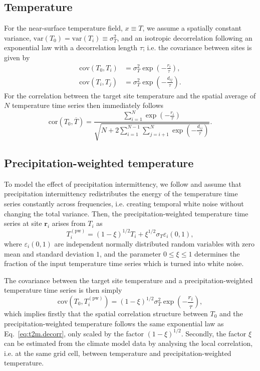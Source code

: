 \documentclass[cp, manuscript]{copernicus}
\begin{document}
\subsection{Temperature}
\label{app:concept.model.t2m}

For the near-surface temperature field, $x \equiv T$, we assume a spatially
constant variance, $\mathrm{var}(T_0)=\mathrm{var}(T_i)\equiv\sigma_T^2$, and an
isotropic decorrelation following an exponential law with a decorrelation length
$\tau$; i.e. the covariance between sites is given by
%
\begin{align}
\label{eq:t2m.decorr}
\mathrm{cov}(T_0,T_i)&=\sigma_T^2\exp{\left(-\frac{r_i}{\tau}\right)},\\
\mathrm{cov}(T_i,T_j)&=\sigma_T^2\exp{\left(-\frac{d_{ij}}{\tau}\right)}.
\end{align}
%
For the correlation between the target site temperature and the spatial average
of $N$ temperature time series then immediately follows
%
\begin{equation}
\label{eq:t2m.corr}
\mathrm{cor}(T_0,\overline{T})=
\frac{\sum_{i=1}^{N}\exp{\left(-\frac{r_i}{\tau}\right)}}
{\sqrt{N+2\sum_{i=1}^{N-1}
\sum_{j=i+1}^{N}{\exp{\left(-\frac{d_{ij}}{\tau}\right)}}}}.
\end{equation}

\subsection{Precipitation-weighted temperature}
\label{app:concept.model.t2m.pw}

To model the effect of precipitation intermittency, we follow
\citet{Laepple2018} and assume that precipitation intermittency redistributes
the energy of the temperature time series constantly across frequencies,
i.e. creating temporal white noise without changing the total variance. Then,
the precipitation-weighted temperature time series at site $\mathbf{r}_i$ arises
from $T_i$ as
%
\begin{equation}
\label{eq:precip.weighting}
T_i^{\mathrm{(pw)}}=
\left(1-\xi\right)^{1/2}T_i + \xi^{1/2} \sigma_T \varepsilon_i(0,1),
\end{equation}
%
where $\varepsilon_i(0,1)$ are independent normally distributed random variables
with zero mean and standard deviation $1$, and the parameter $0\leq\xi\leq1$
determines the fraction of the input temperature time series which is turned
into white noise.

The covariance between the target site temperature and a precipitation-weighted
temperature time series is then simply
\begin{equation}
\label{eq:t2m.pw.decorr}
\mathrm{cov}(T_0,T_i^{\mathrm{(pw)}})=
(1-\xi)^{1/2}\sigma_T^2\exp{\left(-\frac{r_i}{\tau}\right)},
\end{equation}
%
which implies firstly that the spatial correlation structure between $T_0$ and
the precipitation-weighted temperature follows the same exponential law as
Eq.~\eqref{eq:t2m.decorr}, only scaled by the factor $(1-\xi)^{1/2}$. Secondly,
the factor $\xi$ can be estimated from the climate model data by analysing the
local correlation, i.e. at the same grid cell, between temperature and
precipitation-weighted temperature.
\end{document}
